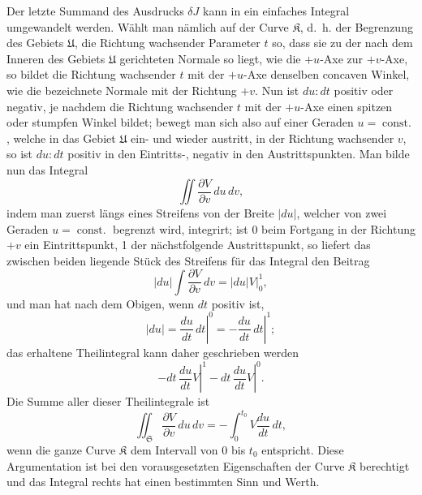 \documentclass[11pt,a4paper,leqno]{article}
\begin{document}
Der letzte Summand des Ausdrucks $\delta J$ kann in ein einfaches
Integral umgewandelt werden. Wählt man nämlich auf
der Curve $\mathfrak{K}$, d.~h. der Begrenzung des Gebiets $\mathfrak{U}$, die Richtung
wachsender Parameter $t$ so, dass sie zu der nach dem Inneren
des Gebiets $\mathfrak{U}$ gerichteten Normale so liegt, wie die $+u$-Axe zur
$+v$-Axe, so bildet die Richtung wachsender $t$ mit der $+u$-Axe
denselben concaven Winkel, wie die bezeichnete Normale mit
der Richtung $+v$. Nun ist $du:dt$ positiv oder negativ, je nachdem
die Richtung wachsender $t$ mit der $+u$-Axe einen spitzen oder
stumpfen Winkel bildet; bewegt man sich also auf einer Geraden
$u=\operatorname{const.}$, welche in das Gebiet $\mathfrak{U}$ ein- und wieder austritt, in
der Richtung wachsender $v$, so ist $du:dt$ positiv in den Eintritts-,
negativ in den Austrittspunkten. Man bilde nun das Integral
\[
\iint\frac{\partial V}{\partial v}\,du\,dv,
\]
indem man zuerst längs eines Streifens von der Breite $|du|$,
welcher von zwei Geraden $u=\operatorname{const.}$ begrenzt wird, integrirt;
ist 0 beim Fortgang in der Richtung $+v$ ein Eintrittspunkt,
1 der nächstfolgende Austrittspunkt, so liefert das zwischen beiden
liegende Stück des Streifens für das Integral den Beitrag
\[
|du|\int\frac{\partial V}{\partial v}\,dv
=|du|\left.V\right|_0^1,
\]
und man hat nach dem Obigen, wenn $dt$ positiv ist,
\[
|du|=\left.\frac{du}{dt}\,dt\right|^0
=-\left.\frac{du}{dt}\,dt\right|^1;
\]
das erhaltene Theilintegral kann daher geschrieben werden
\[
-\left.dt\,\frac{du}{dt}V\right|^1
-\left.dt\,\frac{du}{dt}V\right|^0.
\]
Die Summe aller dieser Theilintegrale ist
\[
\iint_{\mathfrak{S}}\frac{\partial V}{\partial v}\,du\,dv
=-\int_0^{t_0}V\frac{du}{dt}\,dt,
\]
wenn die ganze Curve $\mathfrak{K}$ dem Intervall von 0 bis $t_0$ entspricht.
Diese Argumentation ist bei den vorausgesetzten Eigenschaften
der Curve $\mathfrak{K}$ berechtigt und das Integral rechts hat einen bestimmten
Sinn und Werth.
\end{document}
